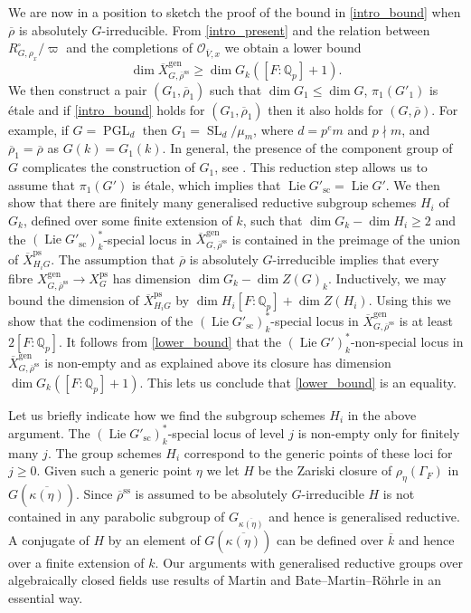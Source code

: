 \documentclass{amsart}
\theoremstyle{definition}
\theoremstyle{remark}
\DeclareMathOperator{\SL}{SL}
\newcommand{\Qp}{\mathbb {Q}_p}
\newcommand{\Vbar}{\overline{{V}}}
\newcommand{\OO}{\mathcal O}
\newcommand{\rhobar}{\overline{\rho}}
\newcommand{\ps}{\mathrm{ps}}
\newcommand{\gen}{\mathrm{gen}}
\DeclareMathOperator{\PGL}{PGL}
\newcommand{\Xbar}{\overline{X}}
\DeclareMathOperator{\Lie}{Lie}
\newcommand{\kbar}{\overline{k}}
\newcommand{\rhobarss}{\rhobar^{\mathrm{ss}}}
\newcommand{\sic}{\operatorname{sc}}
\begin{document}
We are now in a position to sketch the proof of the bound in \eqref{intro_bound} when $\rhobar$ is absolutely $G$-irreducible. 
From \eqref{intro_present} and the relation between $R^{\square}_{G, \rho_x}/\varpi$ and the completions of $\OO_{\Vbar,x}$ we 
obtain a lower bound 
\begin{equation}\label{lower_bound}
\dim \Xbar^{\gen}_{G, \rhobarss}\ge \dim G_k ([F:\Qp]+1).
\end{equation}
We then construct a pair $(G_1, \rhobar_1)$ such that $\dim G_1\le \dim G$, $\pi_1(G'_1)$ is \'etale and if \eqref{intro_bound} holds for 
$(G_1, \rhobar_1)$ then it also holds for $(G, \rhobar)$. For example, 
if $G=\PGL_d$ then $G_1= \SL_d/\mu_m$, where $d=p^e m$ and $p \nmid m$, and $\rhobar_1=\rhobar$ as $G(k)=G_1(k)$. In general, 
the presence of the component group of $G$ complicates the construction
of $G_1$, see . This reduction step allows us 
to assume that $\pi_1(G')$ is \'etale, which implies that 
$\Lie G'_{\sic}=\Lie G'$. We then show that 
there are finitely many generalised reductive subgroup schemes $H_i$ of $G_k$, defined over some finite extension of $k$, such that 
$\dim G_k - \dim H_i \ge 2$ and the $(\Lie G'_{\sic})^*_k$-special locus in $\Xbar^{\gen}_{G, \rhobarss}$ is contained in the preimage of the union of $\Xbar^{\ps}_{H_i G}$. The assumption that $\rhobar$ is absolutely $G$-irreducible implies that every fibre 
$X^{\gen}_{G,\rhobarss}\rightarrow X^{\ps}_G$ has dimension $\dim G_k - \dim Z(G)_k$. 
Inductively, we may bound the dimension of $\Xbar^{\ps}_{H_iG}$ by $\dim H_i [F:\Qp] +\dim Z(H_i)$. 
Using this we show that the codimension of the  $(\Lie G'_{\sic})^*_k$-special locus in $\Xbar^{\gen}_{G, \rhobarss}$
is at least $2[F:\Qp]$. It follows from \eqref{lower_bound} that the $(\Lie G')^*_k$-non-special locus in $\Xbar^{\gen}_{G, \rhobarss}$ is non-empty 
and as explained above its closure has dimension $\dim G_k ([F:\Qp]+1)$. This lets us conclude that \eqref{lower_bound} is an equality.

Let us briefly indicate how we find the subgroup schemes $H_i$ in the above argument. The $(\Lie G'_{\sic})^*_k$-special locus 
of level $j$ is non-empty only for finitely many $j$. The group schemes $H_i$ correspond to the generic points of these 
loci for $j\ge 0$. Given such a generic point $\eta$ we let $H$ be the Zariski closure of $\rho_{\eta}(\Gamma_F)$ 
in $G(\overline{\kappa(\eta)})$. Since $\rhobarss$ is assumed to be absolutely $G$-irreducible $H$ is not contained in 
any parabolic subgroup of $G_{\overline{\kappa(\eta)}}$ and hence is generalised reductive. 
A conjugate of $H$ by an element of $G(\overline{\kappa(\eta)})$ can be defined 
over $\kbar$ and hence over a finite extension of $k$. Our arguments with generalised reductive groups over algebraically closed fields
use results of Martin \cite{martin} and Bate--Martin--R\"{o}hrle \cite{BMR} in an essential way.
\end{document}
